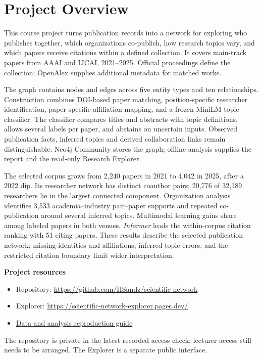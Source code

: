 \chapter*{Project Overview}
This course project turns publication records into a network for exploring who
publishes together, which organizations co-publish, how research topics vary,
and which papers receive citations within a defined collection. It covers
\Papers{} main-track papers from AAAI and IJCAI, 2021--2025. Official
proceedings define the collection; OpenAlex supplies additional metadata for
\MatchedWorks{} matched works.

The graph contains \TotalNodes{} nodes and \TotalEdges{}
edges across five entity types and ten relationships. Construction combines
DOI-based paper matching, position-specific researcher identification,
paper-specific affiliation mapping, and a frozen MiniLM topic classifier.
The classifier compares titles and abstracts with topic definitions, allows
several labels per paper, and abstains on uncertain inputs. Observed publication
facts, inferred topics and derived collaboration links remain distinguishable.
Neo4j Community stores the graph; offline analysis supplies the report and the
read-only Research Explorer.

The selected corpus grows from 2,240 papers in 2021 to 4,042 in 2025, after a
2022 dip. Its researcher network has \CoauthorPairs{} distinct coauthor pairs;
20,776 of 32,189 researchers lie in the largest connected component. Organization
analysis identifies 3,533 academia--industry pair--paper supports and repeated
co-publication around several inferred topics. Multimodal learning gains share
among labeled papers in both venues. \emph{Informer} leads the within-corpus
citation ranking with 51 citing papers. These results describe the selected
publication network; missing identities and affiliations, inferred-topic errors,
and the restricted citation boundary limit wider interpretation.

\textbf{Project resources}
\begin{itemize}
\item Repository: \url{https://github.com/HSandz/scientific-network}
\item Explorer: \url{https://scientific-network-explorer.pages.dev/}
\item \href{https://github.com/HSandz/scientific-network/blob/main/docs/reproduce-remediation-v4.md}{Data and analysis reproduction guide}
\end{itemize}
The repository is private in the latest recorded access check; lecturer access
still needs to be arranged. The Explorer is a separate public interface.
